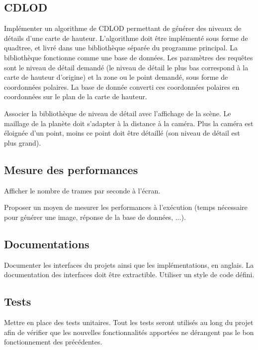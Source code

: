 \documentclass[12pt]{report}
\begin{document}
\subsection{CDLOD}

Implémenter un algorithme de CDLOD permettant de générer des niveaux de détails d'une carte de hauteur. L'algorithme doit être implémenté sous forme de quadtree, et livré dans une bibliothèque séparée du programme principal. La bibliothèque fonctionne comme une base de données. Les paramètres des requêtes sont le niveau de détail demandé (le niveau de détail le plus bas correspond à la carte de hauteur d'origine) et la zone ou le point demandé, sous forme de coordonnées polaires. La base de donnée converti ces coordonnées polaires en coordonnées sur le plan de la carte de hauteur.

Associer la bibliothèque de niveau de détail avec l'affichage de la scène. Le maillage de la planète doit s'adapter à la distance à la caméra. Plus la caméra est éloignée d'un point, moins ce point doit être détaillé (son niveau de détail est plus grand).

\subsection{Mesure des performances}

Afficher le nombre de trames par seconde à l'écran.

Proposer un moyen de mesurer les performances à l’exécution (temps nécessaire pour générer une image, réponse de la base de données, ...).


\subsection{Documentations}

Documenter les interfaces du projets ainsi que les implémentations, en anglais. La documentation des interfaces doit être extractible.
Utiliser un style de code défini.


\subsection{Tests}

Mettre en place des tests unitaires. Tout les tests  seront utilisés au long du projet afin de vérifier que les nouvelles fonctionnalités apportées ne dérangent pas le bon fonctionnement des précédentes.
\end{document}
